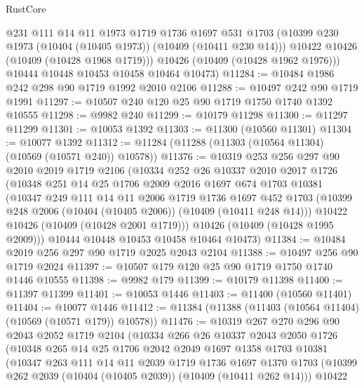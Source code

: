 \begin{lexlean}{RustCore}
\begin{coremodule}
          @231
          @111
          @14
          @11
          @1973
          @1719
          @1736
          @1697
          @531
          @1703
          (@10399 @230 @1973 (@10404 (@10405 @1973)) (@10409 (@10411 @230 @14)))
          @10422
          @10426
          (@10409 (@10428 @1968 @1719)))
        @10426
        (@10409 (@10428 @1962 @1976)))
      @10444
      @10448
      @10453
      @10458
      @10464
      @10473)
@11284 := @10484 @1986 @242 @298 @90 @1719 @1992 @2010 @2106
@11288 := @10497 @242 @90 @1719 @1991
@11297 := @10507 @240 @120 @25 @90 @1719 @1750 @1740 @1392 @10555
@11298 := @9982 @240
@11299 := @10179 @11298
@11300 := @11297 @11299
@11301 := @10053 @1392
@11303 := @11300 (@10560 @11301)
@11304 := @10077 @1392
@11312 := @11284 (@11288 (@11303 (@10564 @11304) (@10569 (@10571 @240)) @10578))
@11376 := @10319
    @253
    @256
    @297
    @90
    @2010
    @2019
    @1719
    @2106
    (@10334
      @252
      @26
      @10337
      @2010
      @2017
      @1726
      (@10348
        @251
        @14
        @25
        @1706
        @2009
        @2016
        @1697
        @674
        @1703
        @10381
        (@10347
          @249
          @111
          @14
          @11
          @2006
          @1719
          @1736
          @1697
          @452
          @1703
          (@10399 @248 @2006 (@10404 (@10405 @2006)) (@10409 (@10411 @248 @14)))
          @10422
          @10426
          (@10409 (@10428 @2001 @1719)))
        @10426
        (@10409 (@10428 @1995 @2009)))
      @10444
      @10448
      @10453
      @10458
      @10464
      @10473)
@11384 := @10484 @2019 @256 @297 @90 @1719 @2025 @2043 @2104
@11388 := @10497 @256 @90 @1719 @2024
@11397 := @10507 @179 @120 @25 @90 @1719 @1750 @1740 @1446 @10555
@11398 := @9982 @179
@11399 := @10179 @11398
@11400 := @11397 @11399
@11401 := @10053 @1446
@11403 := @11400 (@10560 @11401)
@11404 := @10077 @1446
@11412 := @11384 (@11388 (@11403 (@10564 @11404) (@10569 (@10571 @179)) @10578))
@11476 := @10319
    @267
    @270
    @296
    @90
    @2043
    @2052
    @1719
    @2104
    (@10334
      @266
      @26
      @10337
      @2043
      @2050
      @1726
      (@10348
        @265
        @14
        @25
        @1706
        @2042
        @2049
        @1697
        @1358
        @1703
        @10381
        (@10347
          @263
          @111
          @14
          @11
          @2039
          @1719
          @1736
          @1697
          @1370
          @1703
          (@10399 @262 @2039 (@10404 (@10405 @2039)) (@10409 (@10411 @262 @14)))
          @10422

\end{coremodule}
\end{lexlean}
